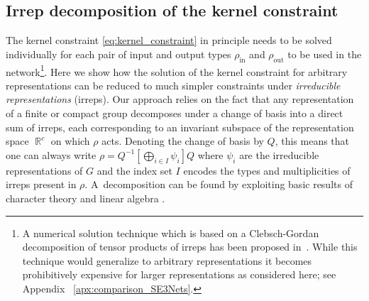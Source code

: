 \documentclass{article}
\newcommand{\apx}{Appendix\xspace
}
\DeclareMathOperator*{\R}{\mathbb{R}}
\newlength{\secBefore}
\newlength{\secAfter}
\newlength{\subsecBefore}
\newlength{\subsecAfter}
\begin{document}
\vspace*{\subsecBefore}
\subsection{Irrep decomposition of the kernel constraint}
\label{sec:irrep_decomposition}
\vspace*{\subsecAfter}

The kernel constraint \eqref{eq:kernel_constraint} in principle needs to be solved individually for each pair of input and output types $\rho_\text{in}$ and $\rho_\text{out}$ to be used in the network\footnote{
		A numerical solution technique which is based on a Clebsch-Gordan decomposition of tensor products of irreps has been proposed in~\cite{3d_steerableCNNs}.
		While this technique would generalize to arbitrary representations it becomes prohibitively expensive for larger representations as considered here; see \apx~\ref{apx:comparison_SE3Nets}.
}.
Here we show how the solution of the kernel constraint for arbitrary representations can be reduced to much simpler constraints under \emph{irreducible representations} (irreps).
Our approach relies on the fact that any representation of a finite or compact group decomposes under a change of basis into a direct sum of irreps, each corresponding to an invariant subspace of the representation space $\R^c$ on which $\rho$ acts.
Denoting the change of basis by $Q$, this means that one can always write
$\rho = Q^{-1}\left[\bigoplus_{i\in I}\psi_i\right]Q$
where $\psi_i$ are the irreducible representations of $G$ and the index set $I$ encodes the types and multiplicities of irreps present in $\rho$.
A~decomposition can be found by exploiting basic results of character theory and linear algebra \cite{serre1977linear}.
\end{document}

